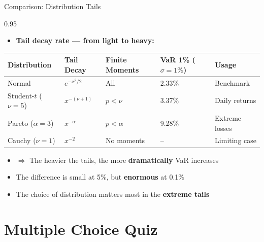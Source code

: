 \documentclass[9pt, aspectratio=169, t]{beamer}
\begin{document}
\begin{frame}{Comparison: Distribution Tails}
\begin{cminipage}{0.95\textwidth}
    \begin{itemize}\setlength{\itemsep}{0pt}
        \item \textbf{Tail decay rate --- from light to heavy:}
    \end{itemize}

    \vspace{0.2cm}
    \small
    \renewcommand{\arraystretch}{1.3}
    \begin{tabular}{lllll}
    \toprule
    \textbf{Distribution} & \textbf{Tail Decay} & \textbf{Finite Moments} & \textbf{VaR 1\%} ($\sigma=1\%$) & \textbf{Usage} \\
    \midrule
    Normal & $e^{-x^2/2}$ & All & 2.33\% & Benchmark \\
    Student-$t$ ($\nu=5$) & $x^{-(\nu+1)}$ & $p < \nu$ & 3.37\% & Daily returns \\
    Pareto ($\alpha=3$) & $x^{-\alpha}$ & $p < \alpha$ & 9.28\% & Extreme losses \\
    Cauchy ($\nu=1$) & $x^{-2}$ & No moments & -- & Limiting case \\
    \bottomrule
    \end{tabular}
    \normalsize

    \vspace{0.3cm}
    \begin{itemize}\setlength{\itemsep}{0pt}
        \item $\Rightarrow$ The heavier the tails, the more \textbf{dramatically} VaR increases
        \item The difference is small at 5\%, but \textbf{enormous} at 0.1\%
        \item The choice of distribution matters most in the \textbf{extreme tails}
    \end{itemize}
\end{cminipage}
\end{frame}

\section{Multiple Choice Quiz}
\end{document}
